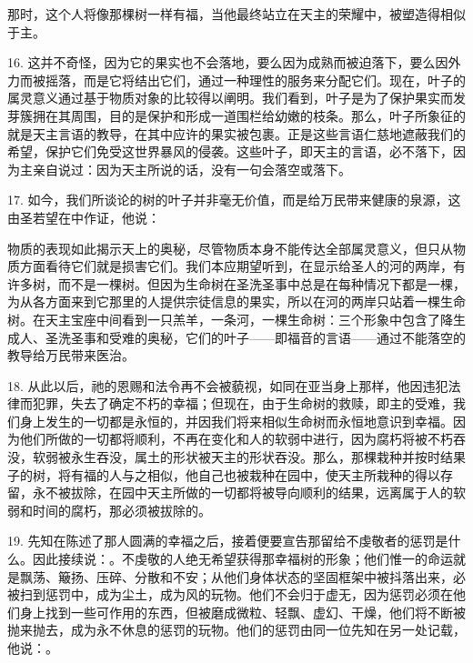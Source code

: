 那时，这个人将像那棵树一样有福，当他最终站立在天主的荣耀中，被塑造得相似于主。\par

16. 这并不奇怪，因为它的果实也不会落地，要么因为成熟而被迫落下，要么因外力而被摇落，而是它将结出它们，通过一种理性的服务来分配它们。现在，叶子的属灵意义通过基于物质对象的比较得以阐明。我们看到，叶子是为了保护果实而发芽簇拥在其周围，目的是保护和形成一道围栏给幼嫩的枝条。那么，叶子所象征的就是天主言语的教导，在其中应许的果实被包裹。正是这些言语仁慈地遮蔽我们的希望，保护它们免受这世界暴风的侵袭。这些叶子，即天主的言语，必不落下，因为主亲自说过：因为天主所说的话，没有一句会落空或落下。\par

17. 如今，我们所谈论的树的叶子并非毫无价值，而是给万民带来健康的泉源，这由圣若望在中作证，他说：\par

物质的表现如此揭示天上的奥秘，尽管物质本身不能传达全部属灵意义，但只从物质方面看待它们就是损害它们。我们本应期望听到，在显示给圣人的河的两岸，有许多树，而不是一棵树。但因为生命树在圣洗圣事中总是在每种情况下都是一棵，为从各方面来到它那里的人提供宗徒信息的果实，所以在河的两岸只站着一棵生命树。在天主宝座中间看到一只羔羊，一条河，一棵生命树：三个形象中包含了降生成人、圣洗圣事和受难的奥秘，它们的叶子——即福音的言语——通过不能落空的教导给万民带来医治。\par

18. 从此以后，祂的恩赐和法令再不会被藐视，如同在亚当身上那样，他因违犯法律而犯罪，失去了确定不朽的幸福；但现在，由于生命树的救赎，即主的受难，我们身上发生的一切都是永恒的，并因我们将来相似生命树而永恒地意识到幸福。因为他们所做的一切都将顺利，不再在变化和人的软弱中进行，因为腐朽将被不朽吞没，软弱被永生吞没，属土的形状被天主的形状吞没。那么，那棵栽种并按时结果子的树，将有福的人与之相似，他自己也被栽种在园中，使天主所栽种的得以存留，永不被拔除，在园中天主所做的一切都将被导向顺利的结果，远离属于人的软弱和时间的腐朽，那必须被拔除的。\par

19. 先知在陈述了那人圆满的幸福之后，接着便要宣告那留给不虔敬者的惩罚是什么。因此接续说：。不虔敬的人绝无希望获得那幸福树的形象；他们惟一的命运就是飘荡、簸扬、压碎、分散和不安；从他们身体状态的坚固框架中被抖落出来，必被扫到惩罚中，成为尘土，成为风的玩物。他们不会归于虚无，因为惩罚必须在他们身上找到一些可作用的东西，但被磨成微粒、轻飘、虚幻、干燥，他们将不断被抛来抛去，成为永不休息的惩罚的玩物。他们的惩罚由同一位先知在另一处记载，他说：。\par

